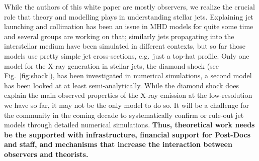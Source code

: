 \documentclass[12pt]{article}
\begin{document}
While the authors of this white paper are mostly observers, we realize the crucial role that theory and modelling plays in understanding stellar jets. Explaining jet launching and collimation has been an issue in MHD models for quite some time and several groups are working on that; similarly jets propagating into the interstellar medium have been simulated in different contexts, but so far those models use pretty simple jet cross-sections, e.g.\ just a top-hat profile. Only one model for the X-ray generation in stellar jets, the diamond shock (see Fig.~\ref{fig:shock}), has been investigated in numerical simulations, a second model has been looked at at least semi-analytically. While the diamond shock does explain the main observed properties of the X-ray emission at the low-resolution we have so far, it may not be the only model to do so. It will be a challenge for the community in the coming decade to systematically confirm or rule-out jet models through detailed numerical simulations. \textbf{Thus, theoretical work needs be the supported with infrastructure, financial support for Post-Docs and staff, and mechanisms that increase the interaction between observers and theorists.}

\pagebreak


\end{document}
